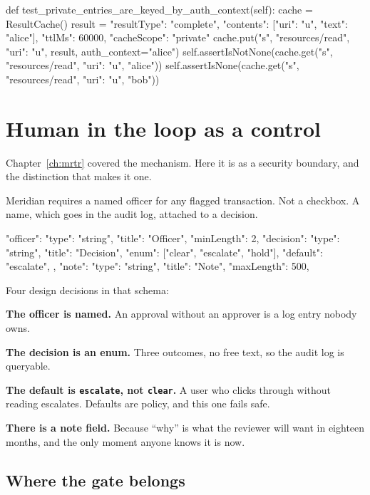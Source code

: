 \begin{py}
def test_private_entries_are_keyed_by_auth_context(self):
    cache = ResultCache()
    result = {"resultType": "complete",
              "contents": [{"uri": "u", "text": "alice"}],
              "ttlMs": 60000, "cacheScope": "private"}
    cache.put("s", "resources/read", {"uri": "u"}, result, auth_context="alice")
    self.assertIsNotNone(cache.get("s", "resources/read", {"uri": "u"}, "alice"))
    self.assertIsNone(cache.get("s", "resources/read", {"uri": "u"}, "bob"))
\end{py}

\section{Human in the loop as a control}

Chapter~\ref{ch:mrtr} covered the mechanism. Here it is as a security boundary,
and the distinction that makes it one.

Meridian requires a named officer for any flagged transaction. Not a checkbox. A
name, which goes in the audit log, attached to a decision.

\begin{py}
"officer": {"type": "string", "title": "Officer", "minLength": 2},
"decision": {
    "type": "string", "title": "Decision",
    "enum": ["clear", "escalate", "hold"],
    "default": "escalate",
},
"note": {"type": "string", "title": "Note", "maxLength": 500},
\end{py}

Four design decisions in that schema:

\textbf{The officer is named.} An approval without an approver is a log entry
nobody owns.

\textbf{The decision is an enum.} Three outcomes, no free text, so the audit log
is queryable.

\textbf{The default is \texttt{escalate}, not \texttt{clear}.} A user who clicks
through without reading escalates. Defaults are policy, and this one fails safe.

\textbf{There is a note field.} Because ``why'' is what the reviewer will want in
eighteen months, and the only moment anyone knows it is now.

\subsection{Where the gate belongs}

